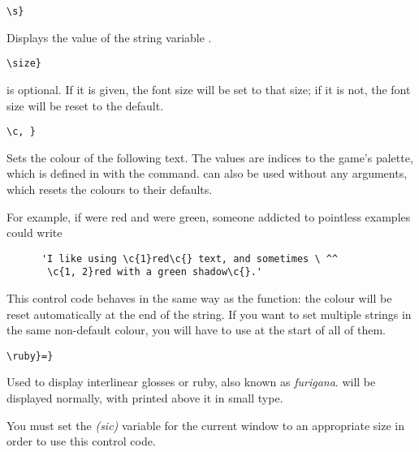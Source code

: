     \lstinline|\s|\rawlbrace{}\lstinline|}|
    \begin{cmdesc}
      Displays the value of the string variable .
    \end{cmdesc}
    \lstinline|\size|\rawlbrace{}\lstinline|}|
    \begin{cmdesc}
       is optional.  If it is given, the font size will be set
      to that size; if it is not, the font size will be reset to the default.
    \end{cmdesc}
    \lstinline|\c|\rawlbrace{}\lstinline|, |\lstinline|}|
    \begin{cmdesc}
      Sets the colour of the following text.  The values are indices to the
      game's palette, which is defined in \gameexe{} with the
       command.   can also be used
      without any arguments, which resets the colours to their defaults.

      For example, if  were red and
       were green, someone addicted to pointless
      examples could write
      \begin{lstlisting}
      'I like using \c{1}red\c{} text, and sometimes \ ^^
       \c{1, 2}red with a green shadow\c{}.'
      \end{lstlisting}

      This control code behaves in the same way as the 
      function: the colour will be reset automatically at the end of the
      string.  If you want to set multiple strings in the same non-default
      colour, you will have to use \ccref{c} at the start of all of them.
    \end{cmdesc}
    \lstinline|\ruby|\rawlbrace{}\lstinline|}=|\rawlbrace{}\lstinline|}|
    \begin{cmdesc}
      Used to display interlinear glosses or ruby, also known as
      \textit{furigana}.  \metavar{text} will be displayed normally, with
      \metavar{gloss} printed above it in small type.

      You must set the 
      \emph{(sic)} variable for the current window to an appropriate size in
      order to use this control code.
    \end{cmdesc}
